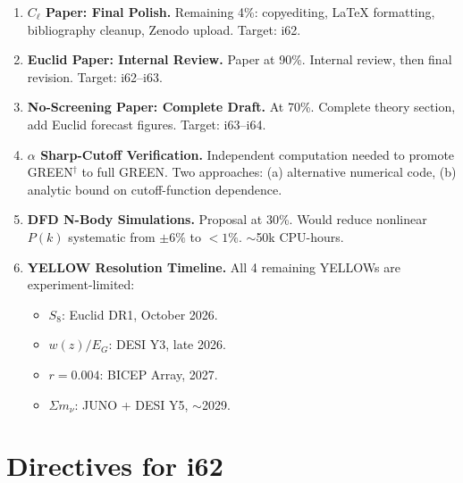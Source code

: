 \documentclass[11pt,a4paper]{article}
\begin{document}
\begin{enumerate}[label=\textbf{P\arabic*.}]
\item \textbf{$C_\ell$ Paper: Final Polish.} Remaining 4\%: copyediting, LaTeX formatting, bibliography cleanup, Zenodo upload. Target: i62.

\item \textbf{Euclid Paper: Internal Review.} Paper at 90\%. Internal review, then final revision. Target: i62--i63.

\item \textbf{No-Screening Paper: Complete Draft.} At 70\%. Complete theory section, add Euclid forecast figures. Target: i63--i64.

\item \textbf{$\alpha$ Sharp-Cutoff Verification.} Independent computation needed to promote GREEN$^\dagger$ to full GREEN. Two approaches: (a) alternative numerical code, (b) analytic bound on cutoff-function dependence.

\item \textbf{DFD N-Body Simulations.} Proposal at 30\%. Would reduce nonlinear $P(k)$ systematic from $\pm 6\%$ to $< 1\%$. $\sim$50k CPU-hours.

\item \textbf{YELLOW Resolution Timeline.} All 4 remaining YELLOWs are experiment-limited:
\begin{itemize}
\item $S_8$: Euclid DR1, October 2026.
\item $w(z)/E_G$: DESI Y3, late 2026.
\item $r = 0.004$: BICEP Array, 2027.
\item $\Sigma m_\nu$: JUNO + DESI Y5, $\sim$2029.
\end{itemize}
\end{enumerate}


\section{Directives for i62}
\label{sec:directives}
\end{document}
